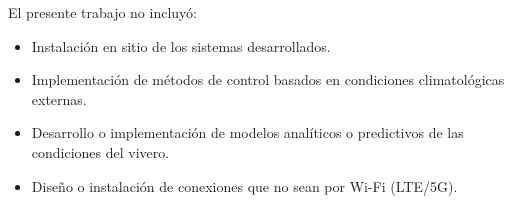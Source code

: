 El presente trabajo no incluyó:
\begin{itemize}
	\item Instalación en sitio de los sistemas desarrollados.
	\item Implementación de métodos de control basados en condiciones climatológicas externas.
	\item Desarrollo o implementación de modelos analíticos o predictivos de las condiciones del vivero.
	\item Diseño o instalación de conexiones que no sean por Wi-Fi (LTE/5G). 
	
\end{itemize}